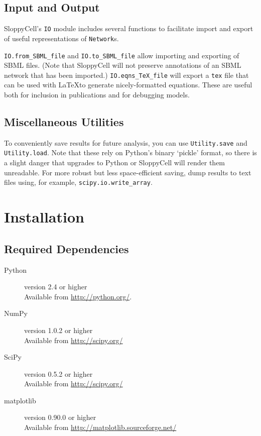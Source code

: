 \documentclass[12pt]{article}
\makeatletter
\newcommand{\py}[1]{\lstinline[language=Python, showstringspaces=False]@#1@}
\newcommand{\shell}[1]{\lstinline[language=csh, showstringspaces=False]!#1!}
\makeatother
\begin{document}
\subsection{Input and Output \label{sec:user:IO}}

SloppyCell's \py{IO} module includes several functions to facilitate import and export of useful representations of \py{Network}s.

\py{IO.from_SBML_file} and \py{IO.to_SBML_file} allow importing and exporting of SBML files. (Note that SloppyCell will not preserve annotations of an SBML network that has been imported.)
\py{IO.eqns_TeX_file} will export a \shell{tex} file that can be used with \LaTeX to generate nicely-formatted equations. These are useful both for inclusion in publications and for debugging models.

\subsection{Miscellaneous Utilities}

To conveniently save results for future analysis, you can use \py{Utility.save} and \py{Utility.load}.
Note that these rely on Python's binary `pickle' format, so there is a slight danger that upgrades to Python or SloppyCell will render them unreadable. For more robust but less space-efficient saving, dump results to text files using, for example, \py{scipy.io.write_array}.


\section{Installation}\label{sec:user:install}

\subsection{Required Dependencies}
\begin{description}

\item[Python] version 2.4 or higher\\
 Available from \url{http://python.org/}.

\item[NumPy] version 1.0.2 or higher\\
 Available from \url{http://scipy.org/}

\item[SciPy] version 0.5.2 or higher\\
 Available from \url{http://scipy.org/}

\item[matplotlib] version 0.90.0 or higher\\
 Available from \url{http://matplotlib.sourceforge.net/}
\end{description}
\end{document}
